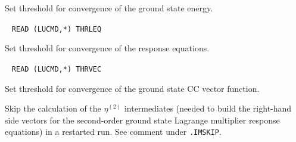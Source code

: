 \begin{description}
       Set threshold for convergence of the ground state energy.
 
\item[\Key{THRLEQ}] \verb| |\newline
       \verb|READ (LUCMD,*) THRLEQ|

       Set threshold for convergence of the response equations.
 
\item[\Key{THRVEC}] \verb| |\newline
       \verb|READ (LUCMD,*) THRVEC|

       Set threshold for convergence of the ground state CC vector function.
 
%
%
\item[\Key{X2SKIP}] 
   Skip the calculation of the $\eta^{(2)}$ intermediates (needed
   to build the right-hand side vectors for the second-order 
   ground state Lagrange multiplier response equations) 
   in a restarted run. See comment under \verb|.IMSKIP|.
%
\end{description}

